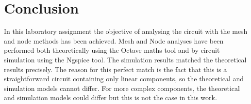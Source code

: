 \section{Conclusion}
\label{sec:conclusion}

In this laboratory assignment the objective of analysing the circuit with the mesh and node methods has been achieved. Mesh and Node analyses have been performed both theoretically using the Octave maths tool and by circuit simulation using the Ngspice tool. The simulation results matched the theoretical results
precisely. The reason for this perfect match is the fact that this is a
straightforward circuit containing only linear components, so the theoretical
and simulation models cannot differ. For more complex components, the
theoretical and simulation models could differ but this is not the case in this
work.

